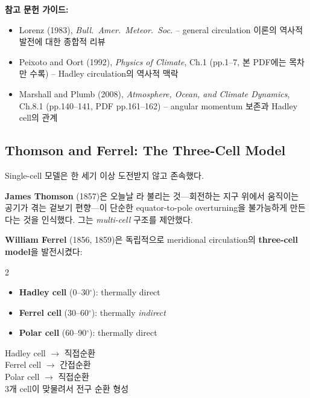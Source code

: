 \begin{hisublock}
\textbf{참고 문헌 가이드:}
\begin{itemize}
  \item Lorenz (1983), \textit{Bull.\ Amer.\ Meteor.\ Soc.} -- general circulation 이론의 역사적 발전에 대한 종합적 리뷰
  \item Peixoto and Oort (1992), \textit{Physics of Climate}, Ch.1 (pp.1--7, 본 PDF에는 목차만 수록) -- Hadley circulation의 역사적 맥락
  \item Marshall and Plumb (2008), \textit{Atmosphere, Ocean, and Climate Dynamics}, Ch.8.1 (pp.140--141, PDF pp.161--162) -- angular momentum 보존과 Hadley cell의 관계
\end{itemize}
\end{hisublock}

\subsection{Thomson and Ferrel: The Three-Cell Model}

Single-cell 모델은 한 세기 이상 도전받지 않고 존속했다.

\textbf{James Thomson} (1857)은 오늘날 라 불리는
것---회전하는 지구 위에서 움직이는 공기가 겪는 겉보기 편향---이
단순한 equator-to-pole overturning을 불가능하게 만든다는 것을 인식했다.
그는 \emph{multi-cell} 구조를 제안했다.

\textbf{William Ferrel} (1856, 1859)은 독립적으로 meridional circulation의
\textbf{three-cell model}을 발전시켰다:

\begin{multicols}{2}
\begin{itemize}
  \item \textbf{Hadley cell} (0--30$^\circ$): thermally direct
  \item \textbf{Ferrel cell} (30--60$^\circ$): thermally \emph{indirect}
  \item \textbf{Polar cell} (60--90$^\circ$): thermally direct
\end{itemize}
\columnbreak
\begin{hisublock}
  Hadley cell $\to$ 직접순환 \\
  Ferrel cell $\to$ 간접순환 \\
  Polar cell $\to$ 직접순환 \\
  3개 cell이 맞물려서 전구 순환 형성
\end{hisublock}
\end{multicols}


